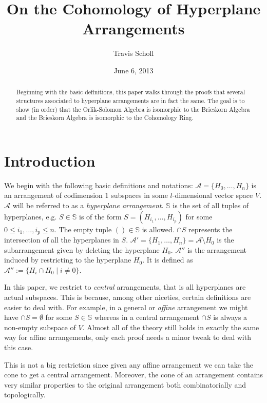 \documentclass[article,twoside]{article}
\date{June 6, 2013}
\newcommand{\mytitle}{On the Cohomology of Hyperplane Arrangements}
\newcommand{\myauthor}{Travis Scholl}
\newcommand{\BB}[1]{\mathbb{#1}}
\newcommand{\script}[1]{\mathcal{#1}}
\newcommand{\tuples}{\BB{S}}
\theoremstyle{plain}
\theoremstyle{plain}
\theoremstyle{plain}
\theoremstyle{plain}
\theoremstyle{plain}
\theoremstyle{definition}
\theoremstyle{definition}
\theoremstyle{definition}
\theoremstyle{remark}
\theoremstyle{remark}
\begin{document}
\title{\sffamily \mytitle}  
\author{\sc \myauthor }
\maketitle

\begin{abstract}
Beginning with the basic definitions, this paper walks through the proofs that several structures associated to hyperplane arrangements are in fact the same. The goal is to show (in order) that the Orlik-Solomon Algebra is isomorphic to the Brieskorn Algebra and the Brieskorn Algebra is isomorphic to the Cohomology Ring.

\end{abstract}

\setcounter{section}{-1}

\section{Introduction}
	\hfil

	We begin with the following basic definitions and notations: $\script{A}=\{H_0,\dots,H_n\}$ is an arrangement of codimension $1$ subspaces in some $l$-dimensional vector space $V$. $\script{A}$ will be referred to as a \emph{hyperplane arrangement}. $\tuples$ is the set of all tuples of hyperplanes, e.g. $S\in \tuples$ is of the form $S=(H_{i_1},\dots,H_{i_p})$ for some $0\leq i_1,\dots,i_p\leq n$. The empty tuple $()\in \tuples$ is allowed. $\cap S$ represents the intersection of all the hyperplanes in $S$. $\script{A}'=\{H_1,\dots,H_n\}=\script{A}\setminus H_0$ is the subarrangement given by deleting the hyperplane $H_0$. $\script{A}''$ is the arrangement induced by restricting to the hyperplane $H_0$. It is defined as $\script{A}'':=\{H_i\cap H_0 \mid i\neq 0\}$.
	
	In this paper, we restrict to \emph{central} arrangements, that is all hyperplanes are actual subspaces. This is because, among other niceties, certain definitions are easier to deal with. For example, in a general or \emph{affine} arrangement we might have $\cap S=\emptyset$ for some $S\in\tuples$ whereas in a central arrangement $\cap S$ is always a non-empty subspace of $V$. Almost all of the theory still holds in exactly the same way for affine arrangements, only each proof needs a minor tweak to deal with this case.
	
	This is not a big restriction since given any affine arrangement we can take the cone to get a central arrangement. Moreover, the cone of an arrangement contains very similar properties to the original arrangement both combinatorially and topologically.
\end{document}

